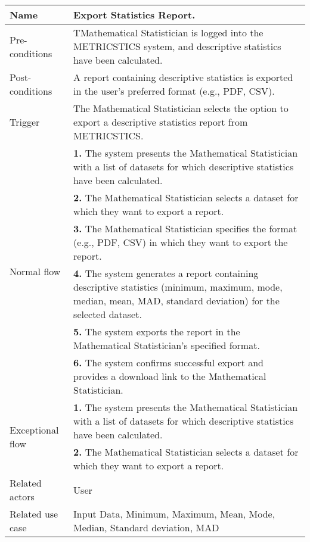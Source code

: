 \begin{table}[htb]
\begin{tabular}{|p{4cm}|p{12cm}|}
         Name & Export Statistics Report. \\ \hline 
         Pre-conditions & TMathematical Statistician is logged into the METRICSTICS system, and descriptive statistics have been calculated. \\ \hline 
         Post-conditions & A report containing descriptive statistics is exported in the user's preferred format (e.g., PDF, CSV).  \\ \hline
         Trigger & The Mathematical Statistician selects the option to export a descriptive statistics report from METRICSTICS. \\ \hline
        \multirow{6}{*}{Normal flow} 
        & \textbf{1.} The system presents the Mathematical Statistician with a list of datasets for which descriptive statistics have been calculated. \\ 
        & \textbf{2.} The Mathematical Statistician selects a dataset for which they want to export a report.   \\ 
 & \textbf{3.}  The Mathematical Statistician specifies the format (e.g., PDF, CSV) in which they want to export the report. \\ 
        & \textbf{4.}  The system generates a report containing descriptive statistics (minimum, maximum, mode, median, mean, MAD, standard deviation) for the selected dataset.   \\
 & \textbf{5.}   The system exports the report in the Mathematical Statistician's specified format. \\ 
        & \textbf{6.}  The system confirms successful export and provides a download link to the Mathematical Statistician.   \\
         
        
        \hline
        \multirow{2}{*}{Exceptional flow} 
        & \textbf{1.} The system presents the Mathematical Statistician with a list of datasets for which descriptive statistics have been calculated. \\ 
        & \textbf{2.} The Mathematical Statistician selects a dataset for which they want to export a report.   \\  \hline 
        Related actors & User \\ \hline
        Related use case & Input Data, Minimum, Maximum, Mean, Mode, Median, Standard deviation, MAD  \\ \hline
    \end{tabular}
   \end{table}
